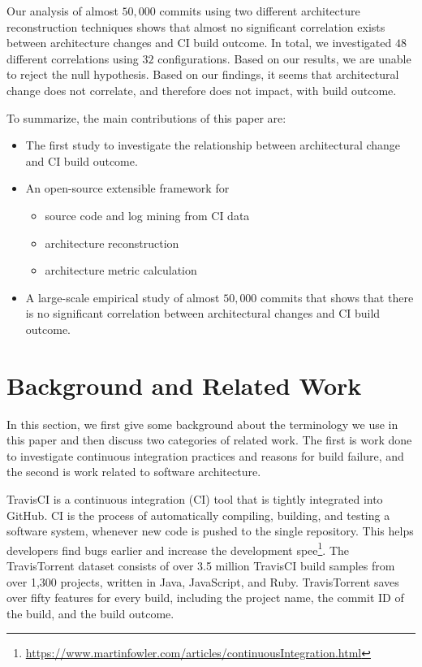 \documentclass[sigconf, anonymous, review]{acmart}
\begin{document}
Our analysis of almost $50,000$ commits using two different architecture reconstruction techniques shows that almost no significant correlation exists between architecture changes and CI build outcome. In total, we investigated $48$ different correlations using $32$ configurations. Based on our results, we are unable to reject the null hypothesis. Based on our findings, it seems that architectural change does not correlate, and therefore does not impact, with build outcome.

To summarize, the main contributions of this paper are:
\begin{itemize}
\item The first study to investigate the relationship between architectural change and CI build outcome.
\item An open-source extensible framework for 
\begin{itemize}
	\item source code and log mining from CI data
	\item architecture reconstruction
	\item architecture metric calculation
\end{itemize}
\item A large-scale empirical study of almost $50,000$ commits that shows that there is no significant correlation between architectural changes and CI build outcome.
\end{itemize}


\section{Background and Related Work}

In this section, we first give some background about the terminology we use in this paper and then discuss two categories of related work. The first is work done to investigate continuous integration practices and reasons for build failure, and the second is work related to software architecture.

TravisCI is a continuous integration (CI) tool that is tightly integrated into GitHub. CI is the process of automatically compiling, building, and testing a software system, whenever new code is pushed to the single repository. This helps developers find bugs earlier and increase the development spee\footnote{\url{https://www.martinfowler.com/articles/continuousIntegration.html}}. 
The TravisTorrent dataset \cite{TravisTorrent} consists of over 3.5 million TravisCI build samples from over 1,300 projects, written in Java, JavaScript, and Ruby.
TravisTorrent saves over fifty features for every build, including the project name, the commit ID of the build, and the build outcome.
\end{document}
